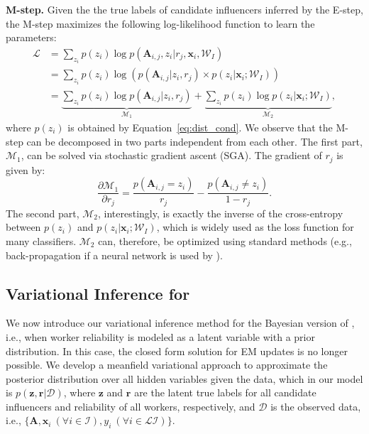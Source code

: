 \smallskip
\noindent\textbf{M-step.}
Given the the true labels of candidate influencers inferred by the E-step, the M-step maximizes the following log-likelihood function to learn the parameters:
\begin{align}
   \mathcal{L} 
    &=\sum_{z_i}p(z_i)\log p(\mathbf{A}_{i,j},z_i|r_j,\mathbf{x}_i,\mathcal{W}_I)\nonumber\\
    &=\sum_{z_i}p(z_i)\log (p(\mathbf{A}_{i,j}| z_i , r_j) \times p(z_i |\mathbf{x}_i;\mathcal{W}_I)) \label{eq:likelihood_m}\\
    &=\underbrace{\sum_{z_i}p(z_i) \log p(\mathbf{A}_{i,j}| z_i , r_j)}_{\mathcal{M}_1}
    +\underbrace{\sum_{z_i}p(z_i)\log p(z_i |\mathbf{x}_i;\mathcal{W}_I)}_{\mathcal{M}_2},
    \nonumber
\end{align}
where $p(z_i)$ is obtained by Equation~\ref{eq:dist_cond}. We observe that the M-step can be decomposed in two parts independent from each other. The first part, $\mathcal{M}_1$, can be solved via stochastic gradient ascent (SGA). The gradient of $r_j$ is given by:
%
\begin{equation}
    \frac{\partial \mathcal{M}_1}{\partial r_j}=\frac{p(\mathbf{A}_{i,j}=z_i)}{r_j}-\frac{p(\mathbf{A}_{i,j}\neq z_i)}{1-r_j}.
    \label{eq:grad_rj}
\end{equation}
%
The second part, $\mathcal{M}_2$, interestingly, is exactly the inverse of the cross-entropy between $p(z_i)$ and $p(z_i |\mathbf{x}_i;\mathcal{W}_I)$, which is widely used as the loss function for many classifiers. $\mathcal{M}_2$ can, therefore, be optimized using standard methods (e.g., back-propagation if a neural network is used by \sys).

\subsection{Variational Inference for \sys}
\label{sec:vi}

We now introduce our variational inference method for the Bayesian version of \sys, i.e., when worker reliability is modeled as a latent variable with a prior distribution. In this case, the closed form solution for EM updates is no longer possible. We develop a meanfield variational approach to approximate the posterior distribution over all hidden variables given the data, which in our model is $p(\mathbf{z},\mathbf{r} | \mathcal{D})$, where $\mathbf{z}$ and $\mathbf{r}$ are the latent true labels for all candidate influencers and reliability of all workers, respectively, and $\mathcal{D}$ is the observed data, i.e., $\{\mathbf{A}, \mathbf{x}_i\ (\forall i\in\mathcal{I}), y_i\ (\forall i\in \mathcal{LI})\}$. 

